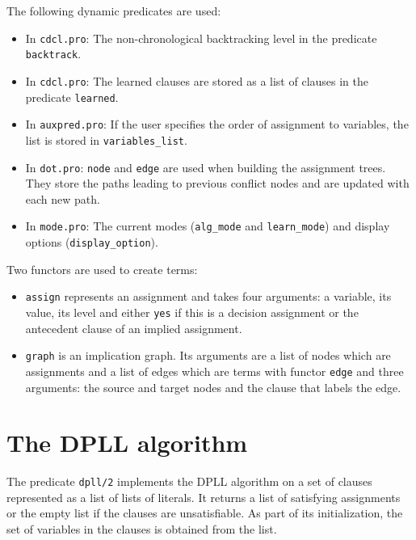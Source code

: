 \documentclass[11pt]{article}
\newcommand*{\p}[1]{\textup{\texttt{#1}}}
\begin{document}
The following dynamic predicates are used:
\begin{itemize}
\item In \p{cdcl.pro}: The non-chronological backtracking level in the
predicate \p{backtrack}.

\item In \p{cdcl.pro}: The learned clauses are stored as a list of
clauses in the predicate \p{learned}.

\item In \p{auxpred.pro}: If the user specifies the order of assignment
to variables, the list is stored in \p{variables\_list}.

\item In \p{dot.pro}: \p{node} and \p{edge} are used when building the
assignment trees. They store the paths leading to previous conflict
nodes and are updated with each new path.

\item In \p{mode.pro}: The current modes (\p{alg\_mode} and
\p{learn\_mode}) and display options (\p{display\_option}).

\end{itemize}

\newpage

Two functors are used to create terms:
\begin{itemize}

\item \p{assign} represents an assignment and takes four arguments: a
variable, its value, its level and either \p{yes} if this is a decision
assignment or the antecedent clause of an implied assignment.

\item \p{graph} is an implication graph. Its arguments are a list of
nodes which are assignments and a list of edges which are terms with
functor \p{edge} and three arguments: the source and target nodes
and the clause that labels the edge.
\end{itemize}


\section{The DPLL algorithm}

The predicate \p{dpll/2} implements the DPLL algorithm on a set of
clauses represented as a list of lists of literals. It returns a list of
satisfying assignments or the empty list if the clauses are
unsatisfiable. As part of its initialization, the set of variables in
the clauses is obtained from the list.
\end{document}
